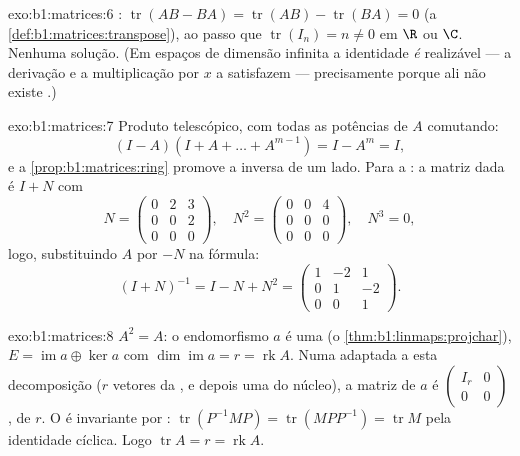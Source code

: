 \begin{solution}{exo:b1:matrices:6}
: $\operatorname{tr}(AB - BA) = \operatorname{tr}(AB) -
\operatorname{tr}(BA) = 0$ (a \cref{def:b1:matrices:transpose}), ao passo que $\operatorname{tr}(I_n) = n \neq 0$ em $\R$ ou $\C$. Nenhuma
solução. (Em espaços de dimensão infinita a identidade \emph{é}
realizável --- a derivação e a multiplicação por $x$ a satisfazem
--- precisamente porque ali não existe .)
\end{solution}

\begin{solution}{exo:b1:matrices:7}
Produto telescópico, com todas as potências de $A$ comutando:
\[
(I - A)(I + A + \dots + A^{m-1}) = I - A^m = I ,
\]
e a \cref{prop:b1:matrices:ring} promove a inversa de um lado. Para a : a matriz
dada é $I + N$ com
\[
N = \begin{pmatrix} 0 & 2 & 3\\ 0 & 0 & 2\\ 0&0&0 \end{pmatrix},
\quad
N^2 = \begin{pmatrix} 0&0&4\\ 0&0&0\\ 0&0&0\end{pmatrix},
\quad N^3 = 0 ,
\]
logo, substituindo $A$ por $-N$ na fórmula:
\[
(I + N)^{-1} = I - N + N^2 =
\begin{pmatrix}
1 & -2 & 1\\
0 & 1 & -2\\
0 & 0 & 1
\end{pmatrix}.
\]
\end{solution}

\begin{solution}{exo:b1:matrices:8}
$A^2 = A$: o endomorfismo $a$ é uma  (o \cref{thm:b1:linmaps:projchar}), $E = \operatorname{im} a \oplus
\ker a$ com
$\dim\operatorname{im} a = r = \operatorname{rk} A$. Numa  adaptada a esta decomposição ($r$ vetores da
, e depois uma  do núcleo), a matriz de $a$ é $\begin{pmatrix} I_r & 0\\ 0 & 0\end{pmatrix}$, de
 $r$. O  é invariante por : $\operatorname{tr}(P^{-1}MP) = \operatorname{tr}(MPP^{-1}) =
\operatorname{tr} M$ pela
identidade cíclica. Logo $\operatorname{tr} A = r = \operatorname{rk} A$.
\end{solution}

